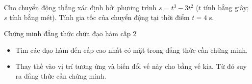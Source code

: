\begin{bt}%
	Cho chuyển động thẳng xác định bởi phương trình $s=t^3-3t^2$ ($t$ tính bằng giây; $s$ tính bằng mét). Tính gia tốc của chuyển động tại thời điểm $t=4$ s.
\end{bt}
\begin{dang}{Chứng minh đẳng thức chứa đạo hàm cấp 2}
	\begin{itemize}
		\item Tìm các đạo hàm đến cấp cao nhất có mặt trong đẳng thức cần chứng minh. 
		\item Thay thế vào vị trí tương ứng và biến đổi vế này cho bằng vế kia. Từ đó suy ra đẳng thức cần chứng minh.
	\end{itemize}
\end{dang}
